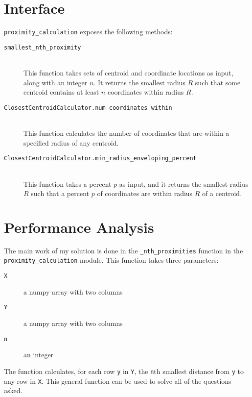 \documentclass{amsart}
\theoremstyle{definition}
\theoremstyle{definition}
\begin{document}
\section{Interface}
\texttt{proximity\_calculation} exposes the following methods:
\begin{description}
\item[\texttt{smallest\_nth\_proximity}]\ \\
  This function takes sets of centroid and coordinate locations as input, along with an integer $n$.  It returns the smallest radius $R$ such that some centroid contains at least $n$ coordinates within radius $R$.
\item[\texttt{ClosestCentroidCalculator.num\_coordinates\_within}]\ \\
  This function calculates the number of coordinates that are within a specified radius of any centroid.
\item[\texttt{ClosestCentroidCalculator.min\_radius\_enveloping\_percent}]\ \\
  This function takes a percent $p$ as input, and it returns the smallest radius $R$ such that a percent $p$ of coordinates are within radius $R$ of a centroid.
\end{description}

\section{Performance Analysis}
The main work of my solution is done in the \texttt{\_nth\_proximities} function in the \texttt{proximity\_calculation} module.  This function takes three parameters:
\begin{description}
\item[\texttt{X}] a numpy array with two columns
\item[\texttt{Y}] a numpy array with two columns
\item[\texttt{n}] an integer
\end{description}
The function calculates, for each row \texttt{y} in \texttt{Y}, the \texttt{n}th smallest distance from \texttt{y} to any row in \texttt{X}.  This general function can be used to solve all of the questions asked.
\end{document}
